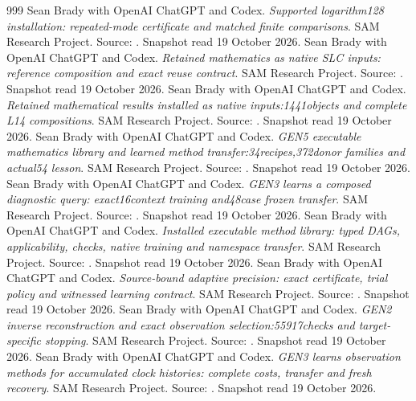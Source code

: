 \begin{thebibliography}{999}
 Sean Brady with OpenAI ChatGPT and Codex. \emph{Supported logarithm128 installation: repeated-mode certificate and matched finite comparisons}. SAM Research Project. Source: . Snapshot read 19 October 2026.
 Sean Brady with OpenAI ChatGPT and Codex. \emph{Retained mathematics as native SLC inputs: reference composition and exact reuse contract}. SAM Research Project. Source: . Snapshot read 19 October 2026.
 Sean Brady with OpenAI ChatGPT and Codex. \emph{Retained mathematical results installed as native inputs:1441objects and complete L14 compositions}. SAM Research Project. Source: . Snapshot read 19 October 2026.
 Sean Brady with OpenAI ChatGPT and Codex. \emph{GEN5 executable mathematics library and learned method transfer:34recipes,372donor families and actual54 lesson}. SAM Research Project. Source: . Snapshot read 19 October 2026.
 Sean Brady with OpenAI ChatGPT and Codex. \emph{GEN3 learns a composed diagnostic query: exact16context training and48case frozen transfer}. SAM Research Project. Source: . Snapshot read 19 October 2026.
 Sean Brady with OpenAI ChatGPT and Codex. \emph{Installed executable method library: typed DAGs, applicability, checks, native training and namespace transfer}. SAM Research Project. Source: . Snapshot read 19 October 2026.
 Sean Brady with OpenAI ChatGPT and Codex. \emph{Source-bound adaptive precision: exact certificate, trial policy and witnessed learning contract}. SAM Research Project. Source: . Snapshot read 19 October 2026.
 Sean Brady with OpenAI ChatGPT and Codex. \emph{GEN2 inverse reconstruction and exact observation selection:55917checks and target-specific stopping}. SAM Research Project. Source: . Snapshot read 19 October 2026.
 Sean Brady with OpenAI ChatGPT and Codex. \emph{GEN3 learns observation methods for accumulated clock histories: complete costs, transfer and fresh recovery}. SAM Research Project. Source: . Snapshot read 19 October 2026.

\end{thebibliography}
